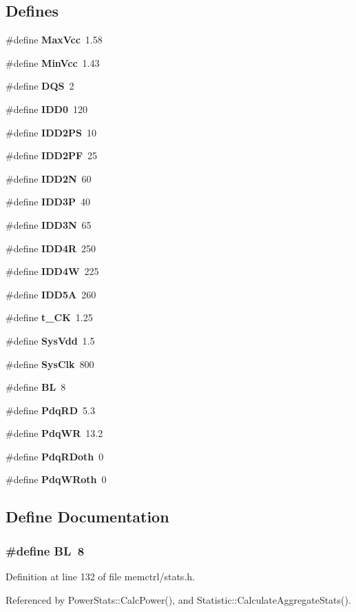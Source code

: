 \subsection*{Defines}
\begin{CompactItemize}
\item 
\#define {\bf MaxVcc}~1.58
\item 
\#define {\bf MinVcc}~1.43
\item 
\#define {\bf DQS}~2
\item 
\#define {\bf IDD0}~120
\item 
\#define {\bf IDD2PS}~10
\item 
\#define {\bf IDD2PF}~25
\item 
\#define {\bf IDD2N}~60
\item 
\#define {\bf IDD3P}~40
\item 
\#define {\bf IDD3N}~65
\item 
\#define {\bf IDD4R}~250
\item 
\#define {\bf IDD4W}~225
\item 
\#define {\bf IDD5A}~260
\item 
\#define {\bf t\_\-CK}~1.25
\item 
\#define {\bf SysVdd}~1.5
\item 
\#define {\bf SysClk}~800
\item 
\#define {\bf BL}~8
\item 
\#define {\bf PdqRD}~5.3
\item 
\#define {\bf PdqWR}~13.2
\item 
\#define {\bf PdqRDoth}~0
\item 
\#define {\bf PdqWRoth}~0
\end{CompactItemize}


\subsection{Define Documentation}
\subsubsection[{BL}]{\setlength{\rightskip}{0pt plus 5cm}\#define BL~8}\label{memctrl_2stats_8h_d567ea9864a3046e47ab69cdc050ecfa}




Definition at line 132 of file memctrl/stats.h.

Referenced by PowerStats::CalcPower(), and Statistic::CalculateAggregateStats().
